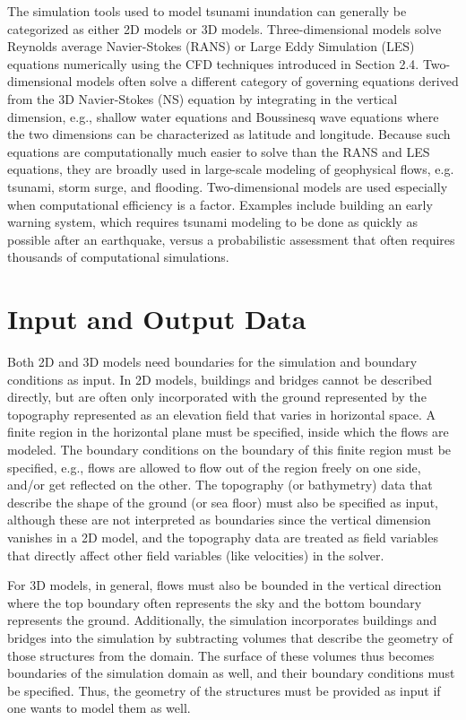The simulation tools used to model tsunami inundation can generally be categorized as either 2D models or 3D models. Three-dimensional models solve Reynolds average Navier-Stokes (RANS) or Large Eddy Simulation (LES) equations numerically using the CFD techniques introduced in Section 2.4. Two-dimensional models often solve a different category of governing equations derived from the 3D Navier-Stokes (NS) equation by integrating in the vertical dimension, e.g., shallow water equations and Boussinesq wave equations where the two dimensions can be characterized as latitude and longitude. Because such equations are computationally much easier to solve than the RANS and LES equations, they are broadly used in large-scale modeling of geophysical flows, e.g. tsunami, storm surge, and flooding. Two-dimensional models are used especially when computational efficiency is a factor. Examples include building an early warning system, which requires tsunami modeling to be done as quickly as possible after an earthquake, versus a probabilistic assessment that often requires thousands of computational simulations.

\section{Input and Output Data}
\label{sec:tsunami_io}

Both 2D and 3D models need boundaries for the simulation and boundary conditions as input. In 2D models, buildings and bridges cannot be described directly, but are often only incorporated with the ground represented by the topography represented as an elevation field that varies in horizontal space. A finite region in the horizontal plane must be specified, inside which the flows are modeled. The boundary conditions on the boundary of this finite region must be specified, e.g., flows are allowed to flow out of the region freely on one side, and/or get reflected on the other. The topography (or bathymetry) data that describe the shape of the ground (or sea floor) must also be specified as input, although these are not interpreted as boundaries since the vertical dimension vanishes in a 2D model, and the topography data are treated as field variables that directly affect other field variables (like velocities) in the solver.

For 3D models, in general, flows must also be bounded in the vertical direction where the top boundary often represents the sky and the bottom boundary represents the ground. Additionally, the simulation incorporates buildings and bridges into the simulation by subtracting volumes that describe the geometry of those structures from the domain. The surface of these volumes thus becomes boundaries of the simulation domain as well, and their boundary conditions must be specified. Thus, the geometry of the structures must be provided as input if one wants to model them as well.

